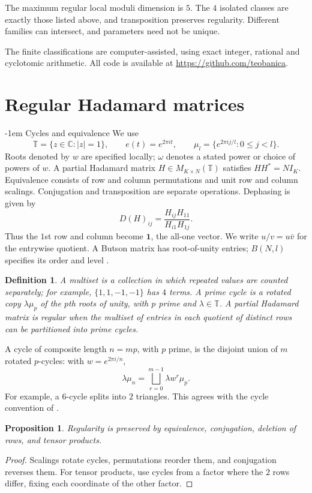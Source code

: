 \documentclass[11pt,a4paper]{article}
\makeatletter
\newtheorem{proposition}[theorem]{Proposition}
\theoremstyle{plain}
\newtheorem{definition}[theorem]{Definition}
\theoremstyle{definition}
\numberwithin{equation}{section}
\renewcommand\subsection{\@startsection{subsection}{2}{\z@}  {\medskipamount}  {-1em}  {\normalfont\normalsize\bfseries}}
\makeatother
\begin{document}
The maximum regular local moduli dimension is $5$. The $4$ isolated classes are exactly those listed above, and transposition preserves regularity. Different families can intersect, and parameters need not be unique.

The finite classifications are computer-assisted, using exact integer, rational and cyclotomic arithmetic. All code is available at {\hypersetup{urlcolor=black}\url{https://github.com/teobanica}}.


\section{Regular Hadamard matrices}\label{sec:background}
\subsection{Cycles and equivalence}\label{bg:basics}\label{bg:cycles}
We use
$$\mathbb T=\{z\in\mathbb C:|z|=1\},\qquad e(t)=e^{2\pi it},\qquad \mu_l=\{e^{2\pi i j/l}:0\leq j<l\}.$$
Roots denoted by $w$ are specified locally; $\omega$ denotes a stated power or choice of powers of $w$.
A partial Hadamard matrix $H\in M_{K\times N}(\mathbb T)$ satisfies $HH^*=NI_K$. Equivalence consists of row and column permutations and unit row and column scalings. Conjugation and transposition are separate operations. Dephasing is given by
$$D(H)_{ij}=\frac{H_{ij}H_{11}}{H_{i1}H_{1j}}.$$
Thus the $1$st row and column become $\mathbf1$, the all-one vector. We write $u/v=u\bar{v}$ for the entrywise quotient. A Butson matrix has root-of-unity entries; $B(N,l)$ specifies its order and level \cite{but}.

\begin{definition}\label{bg:defregular}
A multiset is a collection in which repeated values are counted separately; for example, $\{1,1,-1,-1\}$ has $4$ terms. A prime cycle is a rotated copy $\lambda\mu_p$ of the $p$th roots of unity, with $p$ prime and $\lambda\in\mathbb T$. A partial Hadamard matrix is regular when the multiset of entries in each quotient of distinct rows can be partitioned into prime cycles.
\end{definition}
A cycle of composite length $n=mp$, with $p$ prime, is the disjoint union of $m$ rotated $p$-cycles: with $w=e^{2\pi i/n}$,
$$\lambda\mu_n=\bigsqcup_{r=0}^{m-1}\lambda w^r\mu_p.$$
For example, a $6$-cycle splits into $2$ triangles. This agrees with the cycle convention of \cite{bbs,bop}.

\begin{proposition}\label{bg:operations}
Regularity is preserved by equivalence, conjugation, deletion of rows, and tensor products.
\end{proposition}
\begin{proof}
Scalings rotate cycles, permutations reorder them, and conjugation reverses them. For tensor products, use cycles from a factor where the $2$ rows differ, fixing each coordinate of the other factor.
\end{proof}
\end{document}
